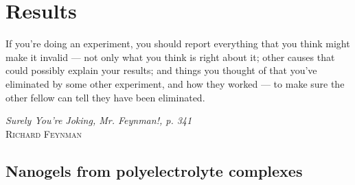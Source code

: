 \chapter{Results}\label{chap:results}
\vspace*{\fill}
\epigraph{If you're doing an experiment, you should report everything that you think might make it invalid — not only what you think is right about it; other causes that could possibly explain your results; and things you thought of that you've eliminated by some other experiment, and how they worked — to make sure the other fellow can tell they have been eliminated.}%
{\textit{Surely You're Joking, Mr. Feynman!, p. 341}\\ \textsc{Richard Feynman}}
\clearpage{\thispagestyle{empty}\cleardoublepage}
\section{Nanogels from polyelectrolyte complexes}




